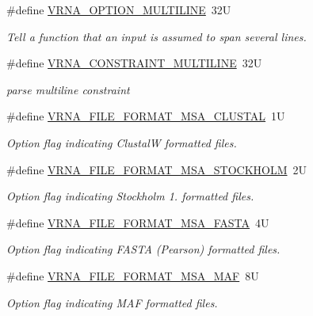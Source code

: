 \begin{DoxyCompactItemize}
\#define \mbox{\hyperlink{group__file__utils_gabec89c09874528c6cb73140a4c3d86d7}{V\+R\+N\+A\+\_\+\+O\+P\+T\+I\+O\+N\+\_\+\+M\+U\+L\+T\+I\+L\+I\+NE}}~32U
\begin{DoxyCompactList}\small\item\em Tell a function that an input is assumed to span several lines. \end{DoxyCompactList}\item 
\#define \mbox{\hyperlink{group__file__utils_ga7d725ef525b29891abef3f1ed42599a4}{V\+R\+N\+A\+\_\+\+C\+O\+N\+S\+T\+R\+A\+I\+N\+T\+\_\+\+M\+U\+L\+T\+I\+L\+I\+NE}}~32U
\begin{DoxyCompactList}\small\item\em parse multiline constraint \end{DoxyCompactList}\item 
\#define \mbox{\hyperlink{group__file__utils_ga79a23de2c7249f2cccd762e475c81859}{V\+R\+N\+A\+\_\+\+F\+I\+L\+E\+\_\+\+F\+O\+R\+M\+A\+T\+\_\+\+M\+S\+A\+\_\+\+C\+L\+U\+S\+T\+AL}}~1U
\begin{DoxyCompactList}\small\item\em Option flag indicating ClustalW formatted files. \end{DoxyCompactList}\item 
\#define \mbox{\hyperlink{group__file__utils_ga62be992445cd8ab2ad7a8fded944338b}{V\+R\+N\+A\+\_\+\+F\+I\+L\+E\+\_\+\+F\+O\+R\+M\+A\+T\+\_\+\+M\+S\+A\+\_\+\+S\+T\+O\+C\+K\+H\+O\+LM}}~2U
\begin{DoxyCompactList}\small\item\em Option flag indicating Stockholm 1. formatted files. \end{DoxyCompactList}\item 
\#define \mbox{\hyperlink{group__file__utils_gacf6274a2c825f34e4131404665b00604}{V\+R\+N\+A\+\_\+\+F\+I\+L\+E\+\_\+\+F\+O\+R\+M\+A\+T\+\_\+\+M\+S\+A\+\_\+\+F\+A\+S\+TA}}~4U
\begin{DoxyCompactList}\small\item\em Option flag indicating F\+A\+S\+TA (Pearson) formatted files. \end{DoxyCompactList}\item 
\#define \mbox{\hyperlink{group__file__utils_gab3186d774c01570d2a47d0308eec4927}{V\+R\+N\+A\+\_\+\+F\+I\+L\+E\+\_\+\+F\+O\+R\+M\+A\+T\+\_\+\+M\+S\+A\+\_\+\+M\+AF}}~8U
\begin{DoxyCompactList}\small\item\em Option flag indicating M\+AF formatted files. \end{DoxyCompactList}\item 

\end{DoxyCompactItemize}
